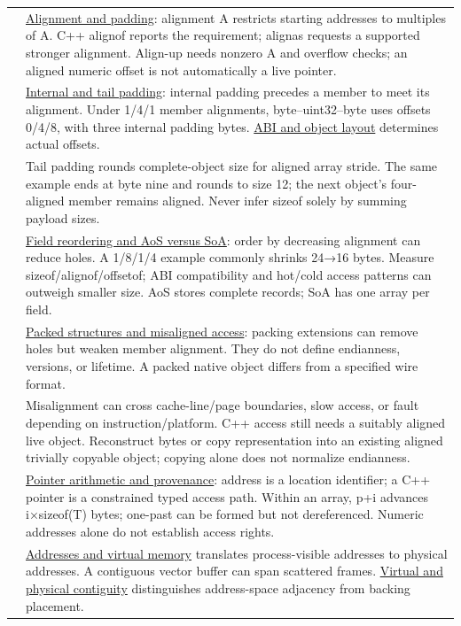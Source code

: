 {\begin{longtable}[]{@{}
  >{\raggedright\arraybackslash}p{}
  >{\raggedright\arraybackslash}p{}@{}}
45 & \hyperref[appendix-a1f7c53b4742]{Alignment and padding}: alignment A restricts starting addresses to multiples of A. C++ alignof reports the requirement; alignas requests a supported stronger alignment. Align-up needs nonzero A and overflow checks; an aligned numeric offset is not automatically a live pointer. \\
46 & \hyperref[appendix-f52f8c5a3afd]{Internal and tail padding}: internal padding precedes a member to meet its alignment. Under 1/4/1 member alignments, byte--uint32--byte uses offsets 0/4/8, with three internal padding bytes. \hyperref[appendix-c4ac6bb0fff8]{ABI and object layout} determines actual offsets. \\
47 & Tail padding rounds complete-object size for aligned array stride. The same example ends at byte nine and rounds to size 12; the next object's four-aligned member remains aligned. Never infer sizeof solely by summing payload sizes. \\
48 & \hyperref[appendix-5522ad176ca0]{Field reordering and AoS versus SoA}: order by decreasing alignment can reduce holes. A 1/8/1/4 example commonly shrinks 24→16 bytes. Measure sizeof/alignof/offsetof; ABI compatibility and hot/cold access patterns can outweigh smaller size. AoS stores complete records; SoA has one array per field. \\
49 & \hyperref[appendix-0682dbfc5f0e]{Packed structures and misaligned access}: packing extensions can remove holes but weaken member alignment. They do not define endianness, versions, or lifetime. A packed native object differs from a specified wire format. \\
50 & Misalignment can cross cache-line/page boundaries, slow access, or fault depending on instruction/platform. C++ access still needs a suitably aligned live object. Reconstruct bytes or copy representation into an existing aligned trivially copyable object; copying alone does not normalize endianness. \\
51 & \hyperref[appendix-6af5921bc853]{Pointer arithmetic and provenance}: address is a location identifier; a C++ pointer is a constrained typed access path. Within an array, p+i advances i×sizeof(T) bytes; one-past can be formed but not dereferenced. Numeric addresses alone do not establish access rights. \\
52 & \hyperref[appendix-18ee4f913c3c]{Addresses and virtual memory} translates process-visible addresses to physical addresses. A contiguous vector buffer can span scattered frames. \hyperref[appendix-f897c1ddac8f]{Virtual and physical contiguity} distinguishes address-space adjacency from backing placement. \\

\end{longtable}}
